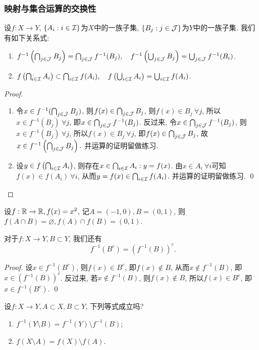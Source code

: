 \subsubsection*{映射与集合运算的交换性}
    设$f: X \to Y$, $\{A_i: i \in \mathcal{I} \}$为$X$中的一族子集, $\{B_j: j \in \mathcal{J} \}$为$Y$中的一族子集. 我们有如下关系式:
    \begin{enumerate}
    \item $f^{-1}\left(\bigcap_{j \in \mathcal{J}}B_j\right) = \bigcap_{j \in \mathcal{J}} f^{-1}(B_j), \quad 
           f^{-1}\left(\bigcup_{j \in \mathcal{J}}B_j\right) = \bigcup_{j \in \mathcal{J}} f^{-1}(B_i)$.
    \item $f\left(\bigcap_{i \in \mathcal{I}}A_i\right) \subset \bigcap_{i \in \mathcal{I}} f(A_i), \quad  
           f\left(\bigcup_{i \in \mathcal{I}}A_i\right) = \bigcup_{i \in \mathcal{I}} f(A_i)$.
    \end{enumerate}
\begin{proof}
    \begin{enumerate}
    \item 令$x \in f^{-1}(\bigcap_{j \in \mathcal{J}}B_j)$, 则$f(x) \in \bigcap_{j \in \mathcal{J}}B_j$, 则$f(x) \in B_j ~\forall j$, 所以$x \in f^{-1}(B_j)~\forall j$, 即$x \in \bigcap_{j \in \mathcal{J}}f^{-1}(B_j)$. 反过来, 令$x \in \bigcap_{j \in \mathcal{J}}f^{-1}(B_j)$, 则$x \in f^{-1}(B_j)~\forall j$, 所以$f(x) \in B_j~\forall j$, 即$f(x) \in \bigcap_{j \in \mathcal{J}}B_j$, 故$x \in f^{-1}\left(\bigcap_{j \in \mathcal{J}}B_j\right).$  并运算的证明留做练习. 
    \item 设$y \in f\left(\bigcap_{i \in \mathcal{I}}A_i\right)$, 则存在$x \in \bigcap_{i \in \mathcal{I}}A_i: y = f(x)$. 由$x \in A_i~\forall i$可知$f(x) \in f(A_i)~\forall i$, 
    从而$y = f(x) \in \bigcap_{i \in \mathcal{I}}f(A_i)$. 并运算的证明留做练习. \qed 
    \end{enumerate} 
\end{proof}
\begin{example}
    设$f: \mathbb{R} \to \mathbb{R}, f(x) = x^2$, 记$A = (-1,0), B = (0,1)$, 则$f(A \cap B)=\varnothing, f(A) \cap f(B) = (0,1)$. 
\end{example}

对于$f:X \to Y, B \subset Y$, 我们还有
$$f^{-1}(B^c) = (f^{-1}(B))^c. $$
\begin{proof}
    设$x \in f^{-1}(B^c)$, 则$f(x) \in B^c$, 即$f(x) \notin B$, 从而$x \notin f^{-1}(B)$, 即$x \in (f^{-1}(B))^c$. 反过来, 若$x \notin f^{-1}(B)$, 则$f(x) \notin B$, 所以$f(x) \in B^c$, 即$x \in f^{-1}(B^c)$. \qed
\end{proof}

\begin{exercise}
    设$f: X \to Y, A \subset X, B \subset Y$, 下列等式成立吗?
    \begin{enumerate}
    \item $f^{-1}(Y \setminus B) = f^{-1}(Y) \setminus f^{-1}(B)$;
    \item $f(X \setminus A) = f(X) \setminus f(A)$. 
    \end{enumerate}
\end{exercise}